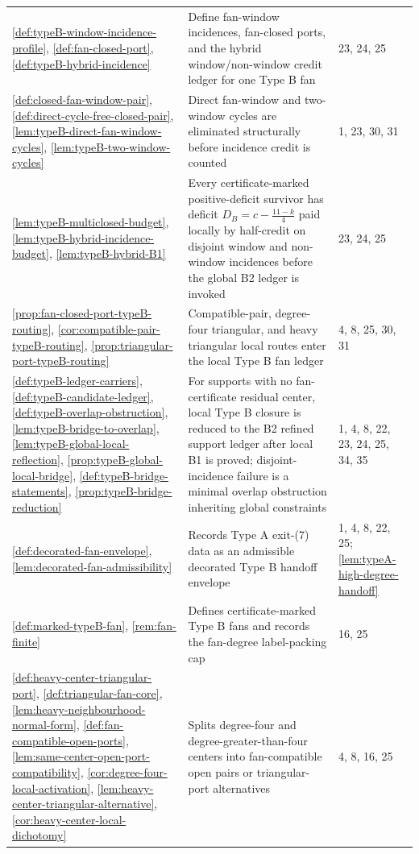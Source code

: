 \documentclass[11pt]{article}
\begin{document}
{\begin{longtable}{L{0.31\textwidth} L{0.42\textwidth} L{0.17\textwidth}}
\cref{def:typeB-window-incidence-profile}, \cref{def:fan-closed-port}, \cref{def:typeB-hybrid-incidence} & Define fan-window incidences, fan-closed ports, and the hybrid window/non-window credit ledger for one Type B fan & 23, 24, 25 \\
\cref{def:closed-fan-window-pair}, \cref{def:direct-cycle-free-closed-pair}, \cref{lem:typeB-direct-fan-window-cycles}, \cref{lem:typeB-two-window-cycles} & Direct fan-window and two-window cycles are eliminated structurally before incidence credit is counted & 1, 23, 30, 31 \\
\cref{lem:typeB-multiclosed-budget}, \cref{lem:typeB-hybrid-incidence-budget}, \cref{lem:typeB-hybrid-B1} & Every certificate-marked positive-deficit survivor has deficit $D_B=c-\frac{11-k}{4}$ paid locally by half-credit on disjoint window and non-window incidences before the global B2 ledger is invoked & 23, 24, 25 \\
\cref{prop:fan-closed-port-typeB-routing}, \cref{cor:compatible-pair-typeB-routing}, \cref{prop:triangular-port-typeB-routing} & Compatible-pair, degree-four triangular, and heavy triangular local routes enter the local Type B fan ledger & 4, 8, 25, 30, 31 \\
\cref{def:typeB-ledger-carriers}, \cref{def:typeB-candidate-ledger}, \cref{def:typeB-overlap-obstruction}, \cref{lem:typeB-bridge-to-overlap}, \cref{lem:typeB-global-local-reflection}, \cref{prop:typeB-global-local-bridge}, \cref{def:typeB-bridge-statements}, \cref{prop:typeB-bridge-reduction} & For supports with no fan-certificate residual center, local Type B closure is reduced to the B2 refined support ledger after local B1 is proved; disjoint-incidence failure is a minimal overlap obstruction inheriting global constraints & 1, 4, 8, 22, 23, 24, 25, 34, 35 \\
\cref{def:decorated-fan-envelope}, \cref{lem:decorated-fan-admissibility} & Records Type A exit-(7) data as an admissible decorated Type B handoff envelope & 1, 4, 8, 22, 25; \cref{lem:typeA-high-degree-handoff} \\
\cref{def:marked-typeB-fan}, \cref{rem:fan-finite} & Defines certificate-marked Type B fans and records the fan-degree label-packing cap & 16, 25 \\
\cref{def:heavy-center-triangular-port}, \cref{def:triangular-fan-core}, \cref{lem:heavy-neighbourhood-normal-form}, \cref{def:fan-compatible-open-ports}, \cref{lem:same-center-open-port-compatibility}, \cref{cor:degree-four-local-activation}, \cref{lem:heavy-center-triangular-alternative}, \cref{cor:heavy-center-local-dichotomy} & Splits degree-four and degree-greater-than-four centers into fan-compatible open pairs or triangular-port alternatives & 4, 8, 16, 25 \\

\end{longtable}}
\end{document}
